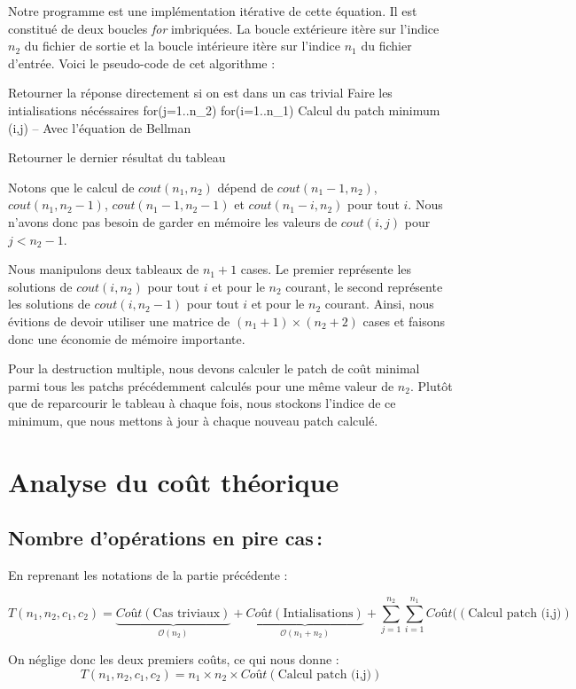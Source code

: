 \documentclass[a4paper, 10pt, french]{article}
\newcommand{\cplx}[1]{\mathcal O \left( #1 \right)}
\begin{document}
Notre programme est une implémentation itérative de cette équation. Il est constitué
de deux boucles \emph{for} imbriquées. La boucle extérieure itère sur l'indice $n_2$
du fichier de sortie et la boucle intérieure itère sur l'indice $n_1$ du fichier
d'entrée.
Voici le pseudo-code de cet algorithme :
\begin{verbatimtab}
	Retourner la réponse directement si on est dans un cas trivial
	Faire les intialisations nécéssaires
	for(j=1..n_2)
	  for(i=1..n_1)
		Calcul du patch minimum (i,j) -- Avec l'équation de Bellman

	Retourner le dernier résultat du tableau
\end{verbatimtab}
Notons que le calcul de $cout(n_1, n_2)$ dépend de $cout(n_1-1, n_2)$,
$cout(n_1, n_2-1)$, $cout(n_1-1, n_2-1)$ et $cout(n_1-i, n_2)$ pour tout $i$.
Nous n'avons donc pas besoin de garder en mémoire les valeurs de $cout(i, j)$ pour
$j < n_2-1$.

Nous manipulons deux tableaux de $n_1+1$ cases. Le premier représente les solutions
de $cout(i, n_2)$ pour tout $i$ et pour le $n_2$ courant, le second représente
les solutions de $cout(i, n_2-1)$ pour tout $i$ et pour le $n_2$ courant.
Ainsi, nous évitions de devoir utiliser une matrice de $(n_1+1)\times(n_2+2)$ cases
et faisons donc une économie de mémoire importante.

Pour la destruction multiple, nous devons calculer le patch de coût minimal parmi
tous les patchs précédemment calculés pour une même valeur de $n_2$.
Plutôt que de reparcourir le tableau à chaque fois, nous stockons l'indice de
ce minimum, que nous mettons à jour à chaque nouveau patch calculé.

\section{Analyse du coût théorique}

  \subsection{Nombre  d'opérations en pire cas\,:}
    En reprenant les notations de la partie précédente :

    \[T(n_1,n_2,c_1,c_2) = \underbrace{Coût(\text{Cas triviaux})}_{\cplx{n_2}} +
    \underbrace{Coût(\text{Intialisations})}_{\cplx{n_1+n_2}} +
    \sum_{j=1}^{n_2} \sum_{i=1}^{n_1} Coût((\text{Calcul patch (i,j)})\]

	On néglige donc les deux premiers coûts, ce qui nous donne :
	\[T(n_1,n_2,c_1,c_2) = n_1 \times n_2 \times Coût(\text{Calcul patch (i,j)})\]
\end{document}
